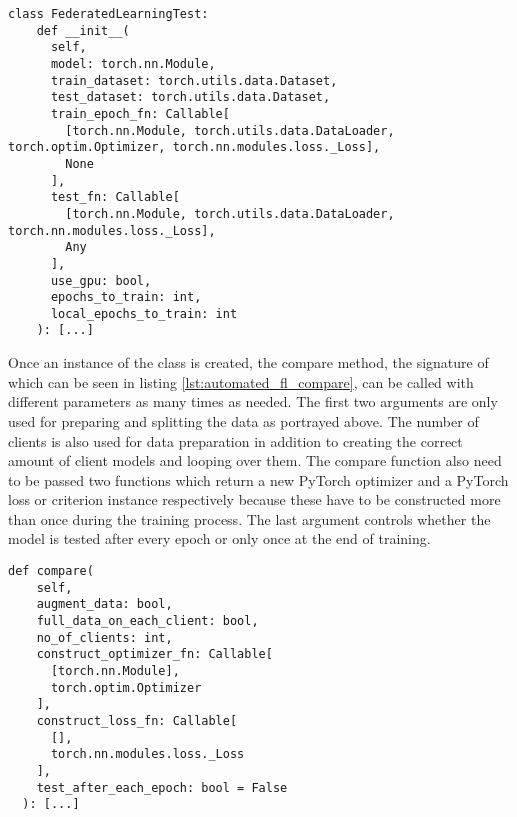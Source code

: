 \begin{lstlisting}[language=CustomPython, style=colorEX, caption=Automated federation learning class initialization, captionpos=t, label=lst:automated_fl_init]
  class FederatedLearningTest:
    def __init__(
      self,
      model: torch.nn.Module,
      train_dataset: torch.utils.data.Dataset,
      test_dataset: torch.utils.data.Dataset,
      train_epoch_fn: Callable[
        [torch.nn.Module, torch.utils.data.DataLoader, torch.optim.Optimizer, torch.nn.modules.loss._Loss], 
        None
      ], 
      test_fn: Callable[
        [torch.nn.Module, torch.utils.data.DataLoader, torch.nn.modules.loss._Loss],
        Any
      ],
      use_gpu: bool,
      epochs_to_train: int,
      local_epochs_to_train: int
    ): [...]
\end{lstlisting}

Once an instance of the class is created, the compare method, the signature of which can be seen in listing \ref{lst:automated_fl_compare}, can be called with different parameters as many times as needed. The first two arguments are only used for preparing and splitting the data as portrayed above. The number of clients is also used for data preparation in addition to creating the correct amount of client models and looping over them. The compare function also need to be passed two functions which return a new PyTorch optimizer and a PyTorch loss or criterion instance respectively because these have to be constructed more than once during the training process. The last argument controls whether the model is tested after every epoch or only once at the end of training.

\begin{lstlisting}[language=CustomPython, style=colorEX, caption=Automated federation learning compare method input, captionpos=t, label=lst:automated_fl_compare]
  def compare(
    self,
    augment_data: bool,
    full_data_on_each_client: bool,
    no_of_clients: int,
    construct_optimizer_fn: Callable[
      [torch.nn.Module],
      torch.optim.Optimizer
    ],
    construct_loss_fn: Callable[
      [],
      torch.nn.modules.loss._Loss
    ],
    test_after_each_epoch: bool = False
  ): [...]
\end{lstlisting}

